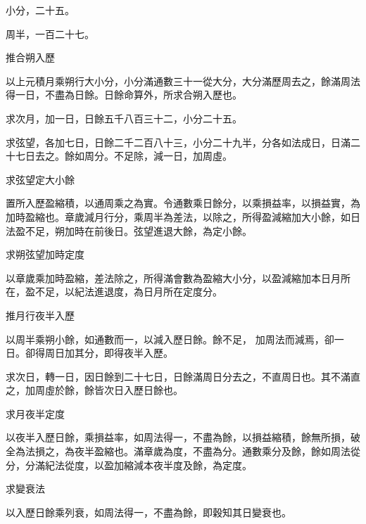 \begin{pinyinscope}
 小分，二十五。



 周半，一百二十七。



 推合朔入歷



 以上元積月乘朔行大小分，小分滿通數三十一從大分，大分滿歷周去之，餘滿周法得一日，不盡為日餘。日餘命算外，所求合朔入歷也。



 求次月，加一日，日餘五千八百三十二，小分二十五。



 求弦望，各加七日，日餘二千二百八十三，小分二十九半，分各如法成日，日滿二十七日去之。餘如周分。不足除，減一日，加周虛。



 求弦望定大小餘



 置所入歷盈縮積，以通周乘之為實。令通數乘日餘分，以乘損益率，以損益實，為加時盈縮也。章歲減月行分，乘周半為差法，以除之，所得盈減縮加大小餘，如日法盈不足，朔加時在前後日。弦望進退大餘，為定小餘。



 求朔弦望加時定度



 以章歲乘加時盈縮，差法除之，所得滿會數為盈縮大小分，以盈減縮加本日月所在，盈不足，以紀法進退度，為日月所在定度分。



 推月行夜半入歷



 以周半乘朔小餘，如通數而一，以減入歷日餘。餘不足，
 加周法而減焉，卻一日。卻得周日加其分，即得夜半入歷。



 求次日，轉一日，因日餘到二十七日，日餘滿周日分去之，不直周日也。其不滿直之，加周虛於餘，餘皆次日入歷日餘也。



 求月夜半定度



 以夜半入歷日餘，乘損益率，如周法得一，不盡為餘，以損益縮積，餘無所損，破全為法損之，為夜半盈縮也。滿章歲為度，不盡為分。通數乘分及餘，餘如周法從分，分滿紀法從度，以盈加縮減本夜半度及餘，為定度。



 求變衰法



 以入歷日餘乘列衰，如周法得一，不盡為餘，即穀知其日變衰也。




\end{pinyinscope}
